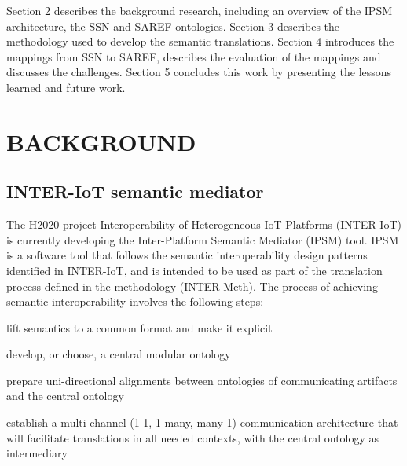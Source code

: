 \documentclass{sig-alternate-05-2015}
\begin{document}
Section 2 describes the background research, including an overview of the IPSM architecture, the SSN and SAREF ontologies. Section 3 describes the methodology used to develop the semantic translations. Section 4 introduces the mappings from SSN to SAREF, describes the evaluation of the mappings and discusses the challenges. Section 5 concludes this work by presenting the lessons learned and future work. 


\section{BACKGROUND}

\subsection{INTER-IoT semantic mediator}
The H2020 project Interoperability of Heterogeneous IoT Platforms (INTER-IoT) \cite{Ganzha2016,Ganzha2017a} is currently developing the  Inter-Platform Semantic Mediator (IPSM) tool. IPSM is a software tool that follows the semantic interoperability design patterns identified in INTER-IoT, and is intended to be used as part of the translation process defined in the methodology (INTER-Meth). The process of achieving semantic interoperability involves the following steps:

\begin{enumerate*}[label=\roman*)]
	\item lift semantics to a common format and make it explicit \cite{Ganzha2017a}
	\item develop, or choose, a central modular ontology
	\item prepare uni-directional alignments between ontologies of communicating artifacts and the central ontology
	\item establish a multi-channel (1-1, 1-many, many-1) communication architecture that will facilitate translations in all needed contexts, with the central ontology as intermediary
\end{enumerate*}

\end{document}
